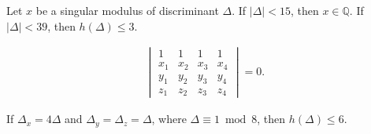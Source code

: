 \documentclass[10pt,a4paper]{amsart}
\newcommand{\Q}{\mathbb{Q}} %
\begin{document}
\begin{lem}\label{lem:smallclass}
	Let $x$ be a singular modulus of discriminant $\Delta$. If $\lvert \Delta \rvert < 15$, then $x \in \Q$. If $\lvert \Delta \rvert < 39$, then $h(\Delta)  \leq 3$.
\end{lem}

\begin{align}\label{eq:det}
	\begin{vmatrix}
		1 & 1 & 1 & 1\\
		x_1 & x_2 & x_3 & x_4\\
		y_1 & y_2 & y_3 & y_4\\
		z_1 & z_2 & z_3 & z_4
	\end{vmatrix}= 0.
\end{align}

\begin{claim}\label{cl10}
	If $\Delta_x = 4 \Delta$ and $\Delta_y = \Delta_z = \Delta$, where $\Delta \equiv 1 \bmod 8$, then $h(\Delta) \leq 6$.
\end{claim}
\end{document}
